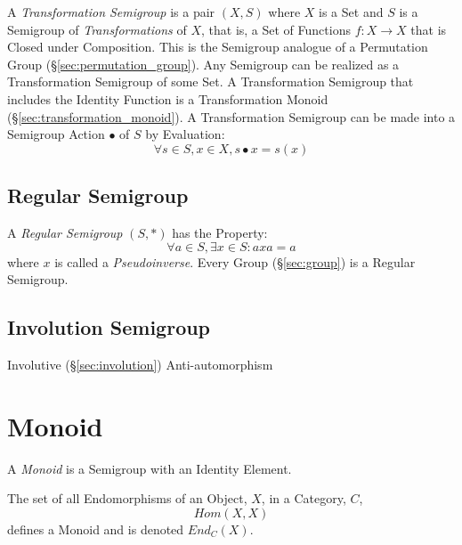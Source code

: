 A \emph{Transformation Semigroup} is a pair $(X,S)$ where $X$ is a Set
and $S$ is a Semigroup of \emph{Transformations} of $X$, that is, a
Set of Functions $f : X \rightarrow X$ that is Closed under
Composition. This is the Semigroup analogue of a Permutation Group
(\S\ref{sec:permutation_group}). Any Semigroup can be realized as a
Transformation Semigroup of some Set. A Transformation Semigroup that
includes the Identity Function is a Transformation Monoid
(\S\ref{sec:transformation_monoid}). A Transformation Semigroup can be
made into a Semigroup Action $\bullet$ of $S$ by Evaluation:
\[
  \forall s \in S, x \in X, s \bullet x = s(x)
\]



\subsection{Regular Semigroup}\label{sec:regular_semigroup}

A \emph{Regular Semigroup} $(S,*)$ has the Property:
\[
  \forall a \in S, \exists x \in S : axa = a
\]
where $x$ is called a \emph{Pseudoinverse}. Every Group
(\S\ref{sec:group}) is a Regular Semigroup.



\subsection{Involution Semigroup}\label{sec:involution_semigroup}

Involutive (\S\ref{sec:involution}) Anti-automorphism



\section{Monoid}\label{sec:monoid}

A \emph{Monoid} is a Semigroup with an Identity Element.

The set of all Endomorphisms of an Object, $X$, in a Category, $C$,
\[
    Hom(X,X)
\]
defines a Monoid and is denoted $End_C(X)$.



